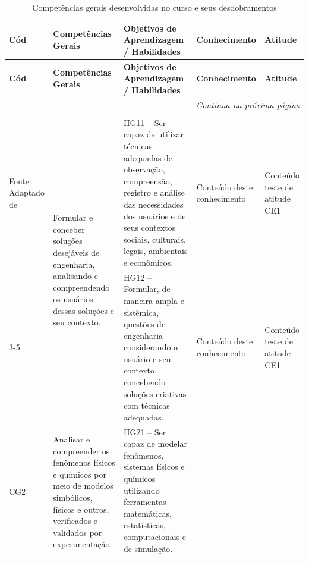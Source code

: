 \begin{landscape}
	
	\scriptsize
	\begin{longtable}{m{1cm} m{5cm} m{8cm} m{5cm} m{5cm}}
		\caption{Competências gerais desenvolvidas no curso e seus desdobramentos}
		\label{tab:competencias_gerais} \\
		\hline
		\textbf{Cód} & \textbf{Competências Gerais} & \textbf{Objetivos de Aprendizagem / Habilidades} & \textbf{Conhecimento} & \textbf{Atitude} \\
		\hline
		\endfirsthead
		
		\hline
		\textbf{Cód} & \textbf{Competências Gerais} & \textbf{Objetivos de Aprendizagem / Habilidades} & \textbf{Conhecimento} & \textbf{Atitude} \\
		\hline
		\endhead
		
		\multicolumn{5}{r}{\textit{Continua na próxima página}}\\
		\endfoot
		
		\hline
		\caption*{\\ Fonte: \normalfont Adaptado de \citeonline{res259}}
		\endlastfoot
		
		
		\multirow{2}{*}{CG1} &
		\multirow{2}{5cm}{Formular e conceber soluções desejáveis de engenharia, analisando e compreendendo os usuários dessas soluções e seu contexto.}
		& HG11 – Ser capaz de utilizar técnicas adequadas de observação, compreensão, registro e análise das necessidades dos usuários e de seus contextos sociais, culturais, legais, ambientais e econômicos.
		& Conteúdo deste conhecimento
		& Conteúdo teste de atitude CE1
		\\ \cline{3-5}
		
		&
		& HG12 – Formular, de maneira ampla e sistêmica, questões de engenharia considerando o usuário e seu contexto, concebendo soluções criativas com técnicas adequadas.
		& Conteúdo deste conhecimento
		& Conteúdo teste de atitude CE1
		\\ \hline
		
		
		\multirow{4}{*}{CG2} &
		\multirow{4}{5cm}{Analisar e compreender os fenômenos físicos e químicos por meio de modelos simbólicos, físicos e outros, verificados e validados por experimentação.}
		& HG21 – Ser capaz de modelar fenômenos, sistemas físicos e químicos utilizando ferramentas matemáticas, estatísticas, computacionais e de simulação.
		& 
		& 
		\\ \cline{3-5}
		

\end{longtable}
\end{landscape}
